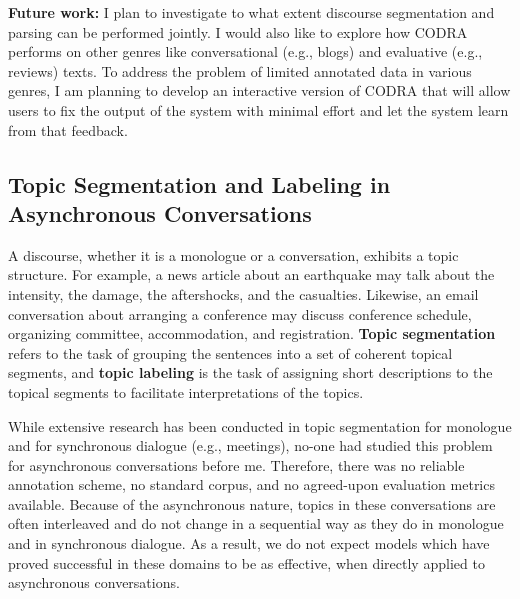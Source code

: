 \documentclass{article} %
\begin{document}
\textbf{Future work:} I plan to investigate to what extent discourse segmentation and parsing can be performed jointly. I would also like to explore how CODRA performs on other genres like conversational (e.g., blogs) and evaluative (e.g., reviews) texts. To address the problem of limited annotated data in various genres, I am planning to develop an interactive version of CODRA that will allow users to fix the output of the system with minimal effort and let the system learn from that feedback.



\subsection{Topic Segmentation and Labeling in Asynchronous Conversations}

A discourse, whether it is a monologue or a conversation, exhibits a topic structure. For example, a news article about an earthquake may talk about the intensity, the damage, the aftershocks, and the casualties. Likewise, an email conversation about arranging a conference may discuss conference schedule, organizing committee, accommodation,  and registration. \textbf{Topic segmentation} refers to the task of grouping the sentences into a set of coherent topical segments, and \textbf{topic labeling} is the
task of assigning short descriptions to the topical segments to facilitate interpretations of the topics. 


While extensive research has been conducted in topic segmentation for monologue and for synchronous dialogue (e.g., meetings), no-one had studied this problem for asynchronous conversations before me. Therefore, there was no reliable annotation scheme, no standard corpus, and no agreed-upon evaluation metrics available. Because of the asynchronous nature, topics in these conversations are often interleaved and do not change in a sequential way as they do in monologue and in synchronous dialogue. As a result, we do not expect models which have proved successful in these domains to be as effective, when directly applied to asynchronous conversations.  

\end{document}
